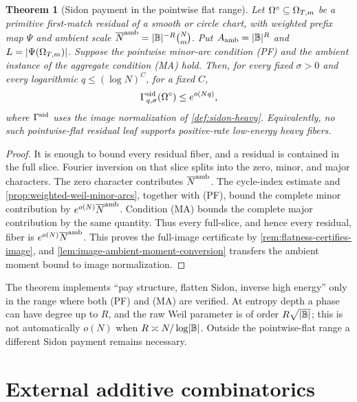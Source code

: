 \documentclass[11pt,a4paper]{amsart}
\numberwithin{equation}{section}
\newtheorem{theorem}{Theorem}[section]
\theoremstyle{remark}
\begin{document}
\begin{theorem}[Sidon payment in the pointwise flat range]\label{thm:sidon-resolved-payment}
Let \(\Omega^{\circ}\subseteq\Omega_{T,m}\) be a primitive first-match residual of a
smooth or circle chart, with weighted prefix map \(\Psi\) and ambient
scale \(\overline N^{\rm amb}=\lvert \mathbb B\rvert^{-R}\binom Nm\).  Put
\(A_{\rm amb}=\lvert \mathbb B\rvert^R\) and
\(L=\lvert \Psi(\Omega_{T,m})\rvert\).  Suppose the pointwise minor-arc
condition \textup{(PF)} and the ambient instance of the aggregate
condition \textup{(MA)} hold.
Then, for every fixed \(\sigma>0\) and every
logarithmic \(q\le(\log N)^C\), for a fixed \(C\),
\[
        \Gamma^{\rm sid}_{q,\sigma}(\Omega^{\circ})\le e^{o(Nq)},
\]
where \(\Gamma^{\rm sid}\) uses the image normalization of
\cref{def:sidon-heavy}.
Equivalently, no such pointwise-flat residual leaf supports positive-rate
low-energy heavy fibers.
\end{theorem}

\begin{proof}
It is enough to bound every residual fiber, and a residual is contained in
the full slice.  Fourier inversion on that slice splits into the zero,
minor, and major characters.  The zero character contributes
\(\overline N^{\rm amb}\).
The cycle-index estimate and \cref{prop:weighted-weil-minor-arcs}, together
with \textup{(PF)}, bound the complete minor contribution by
\(e^{o(N)}\overline N^{\rm amb}\).  Condition \textup{(MA)} bounds the complete major
contribution by the same quantity.  Thus every full-slice, and hence every
residual, fiber is \(e^{o(N)}\overline N^{\rm amb}\).  This proves the
full-image certificate by \cref{rem:flatness-certifies-image}, and
\cref{lem:image-ambient-moment-conversion} transfers the ambient moment
bound to image normalization.
\end{proof}

\begin{remark}
The theorem implements ``pay structure, flatten Sidon, inverse high energy''
only in the range where both \textup{(PF)} and \textup{(MA)} are verified.
At entropy depth a phase
can have degree up to \(R\), and the raw Weil parameter is of order
\(R\sqrt{\lvert \mathbb B\rvert}\); this is not automatically \(o(N)\) when
\(R\asymp N/\log\lvert \mathbb B\rvert\).  Outside the pointwise-flat range a different
Sidon payment remains necessary.
\end{remark}

\section{External additive combinatorics}\label{sec:additive-tools}
\end{document}
